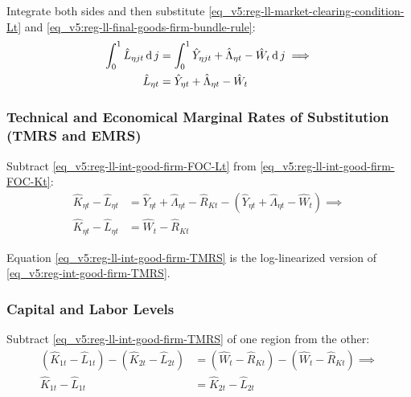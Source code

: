 \documentclass[../thesis.tex]{subfiles}
\begin{document}
Integrate both sides and then substitute \ref{eq_v5:reg-ll-market-clearing-condition-Lt} and \ref{eq_v5:reg-ll-final-goods-firm-bundle-rule}:
\begin{align}
	\int_{0}^{1} \hat{L}_{\eta jt} \operatorname{d} j &= \int_{0}^{1} \hat{Y}_{\eta jt} + \hat{\Lambda}_{\eta t} - \hat{W}_{t} \operatorname{d} j \implies \nonumber \\
	\hat{L}_{\eta t} &= \hat{Y}_{\eta t} + \hat{\Lambda}_{\eta t} - \hat{W}_{t}
	\label{eq_v5:reg-ll-int-good-firm-FOC-Lt}
\end{align}


\subsubsection*{Technical and Economical Marginal Rates of Substitution (TMRS and EMRS)}

Subtract \ref{eq_v5:reg-ll-int-good-firm-FOC-Lt} from \ref{eq_v5:reg-ll-int-good-firm-FOC-Kt}:
\begin{align}
	\hat{K}_{\eta t} - \hat{L}_{\eta t} &= \hat{Y}_{\eta t} + \hat{\Lambda}_{\eta t} - \hat{R}_{K t} - (\hat{Y}_{\eta t} + \hat{\Lambda}_{\eta t} - \hat{W}_{t}) \implies \nonumber \\
	\hat{K}_{\eta t} - \hat{L}_{\eta t} &= \hat{W}_{t} - \hat{R}_{K t} \label{eq_v5:reg-ll-int-good-firm-TMRS}
\end{align}

Equation \ref{eq_v5:reg-ll-int-good-firm-TMRS} is the log-linearized version of \ref{eq_v5:reg-int-good-firm-TMRS}.


\begin{tcolorbox}[colback=red!5!white,colframe=red!75!black]

\subsubsection*{Capital and Labor Levels}
	
	Subtract \ref{eq_v5:reg-ll-int-good-firm-TMRS} of one region from the other:
	\begin{align}
		(\hat{K}_{1t} - \hat{L}_{1t}) - (\hat{K}_{2t} - \hat{L}_{2t}) &= (\hat{W}_{t} - \hat{R}_{K t}) - (\hat{W}_{t} - \hat{R}_{K t}) \implies \nonumber \\
		\hat{K}_{1t} - \hat{L}_{1t} &= \hat{K}_{2t} - \hat{L}_{2t} \label{eq_v5:reg-ll-int-good-firm-TMRS-b}
	\end{align}
	
\end{tcolorbox}
\end{document}

